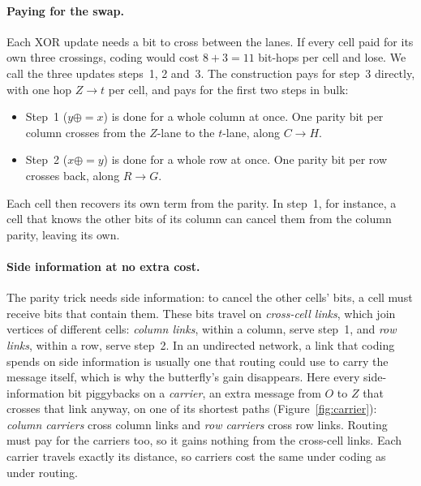 \documentclass[11pt]{article}
\newcommand{\xeq}{\mathrel{\oplus\!\!=}}
\begin{document}
\paragraph{Paying for the swap.} Each XOR update needs a bit to cross between the lanes. If every cell paid for its own three crossings, coding would cost $8+3=11$ bit-hops per cell and lose. We call the three updates steps~1, 2 and~3. The construction pays for step~3 directly, with one hop $Z\to t$ per cell, and pays for the first two steps in bulk:
\begin{itemize}[nosep]
\item Step~1 ($y\xeq x$) is done for a whole column at once. One parity bit per column crosses from the $Z$-lane to the $t$-lane, along $C\to H$.
\item Step~2 ($x\xeq y$) is done for a whole row at once. One parity bit per row crosses back, along $R\to G$.
\end{itemize}
Each cell then recovers its own term from the parity. In step~1, for instance, a cell that knows the other bits of its column can cancel them from the column parity, leaving its own.

\paragraph{Side information at no extra cost.} The parity trick needs side information: to cancel the other cells' bits, a cell must receive bits that contain them. These bits travel on \emph{cross-cell links}, which join vertices of different cells: \emph{column links}, within a column, serve step~1, and \emph{row links}, within a row, serve step~2. In an undirected network, a link that coding spends on side information is usually one that routing could use to carry the message itself, which is why the butterfly's gain disappears. Here every side-information bit piggybacks on a \emph{carrier}, an extra message from $O$ to $Z$ that crosses that link anyway, on one of its shortest paths (Figure~\ref{fig:carrier}): \emph{column carriers} cross column links and \emph{row carriers} cross row links. Routing must pay for the carriers too, so it gains nothing from the cross-cell links. Each carrier travels exactly its distance, so carriers cost the same under coding as under routing.
\end{document}
